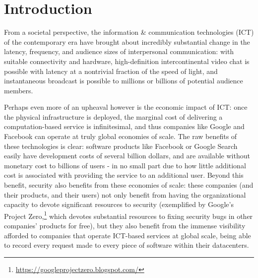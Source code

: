 \documentclass[sigconf,authordraft]{acmart}
\begin{document}


\maketitle

\section{Introduction}



From a societal perspective, the information \& communication technologies (ICT) of the contemporary
era have brought about incredibly substantial change in the latency, frequency, and audience sizes
of interpersonal communication: with suitable connectivity and hardware, high-definition
intercontinental video chat is possible with latency at a nontrivial fraction of the speed of light,
and instantaneous broadcast is possible to millions or billions of potential audience members.

Perhaps even more of an upheaval however is the economic impact of ICT: once the physical
infrastructure is deployed, the marginal cost of delivering a computation-based service is
infinitesimal, and thus companies like Google and Facebook can operate at truly global economies of
scale. The raw benefits of these technologies is clear: software products like Facebook or Google
Search easily have development costs of several billion dollars, and are available without monetary
cost to billions of users - in no small part due to how little additional cost is associated with
providing the service to an additional user. Beyond this benefit, security also benefits from these
economies of scale: these companies (and their products, and their users) not only benefit from
having the organizational capacity to devote significant resources to security (exemplified by
Google's Project Zero,\footnote{\url{https://googleprojectzero.blogspot.com/}} which devotes
substantial resources to fixing security bugs in other companies' products for free), but they also
benefit from the immense visibility afforded to companies that operate ICT-based services at global
scale, being able to record every request made to every piece of software within their datacenters.
\end{document}
